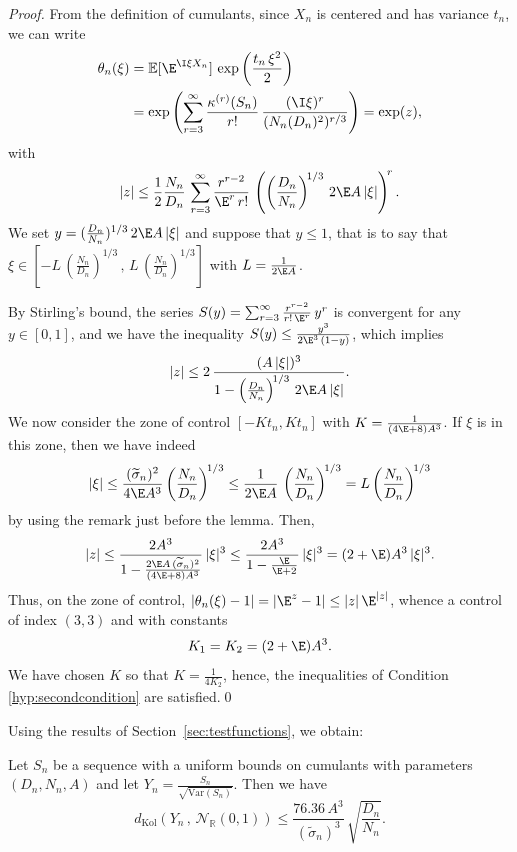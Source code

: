 \documentclass[envcountsame]{svmult}
\newcommand{\R}{\mathbb{R}}
\newcommand{\esper}{\mathbb{E}}
\newcommand{\dkol}{d_\mathrm{Kol}}
\newcommand{\var}{\mathrm{Var}}
\newcommand{\gauss}{\mathcal{N}_{\R}(0,1)}
\begin{document}
\begin{proof}
  From the definition of cumulants, since $X_n$ is centered and has variance $t_n$, we can write
\begin{align*}
 \theta_n(\xi)&=\esper[\E^{\I \xi X_n}] \,\exp\left(\frac{t_n\,\xi^2}{2}\right) \\
 &= \exp\left(\sum_{r= 3}^\infty \frac{\kappa^{(r)}(S_n)}{r!}\,\frac{(\I\xi)^r}{(N_n(D_n)^2)^{r/3}}\right) = \exp(z),
 \end{align*}
with
\[
|z| \leq \frac{1}{2} \frac{N_n}{D_n}\,\sum_{r=3}^\infty \frac{r^{r-2}}{\E^r\,r!} \,\left(\left(\frac{D_n}{N_n}\right)^{\!1/3}\,2\E A\, |\xi|\right)^{\!r}.
\]
We set $y=(\frac{D_n}{N_n})^{1/3}\,2\E A\, |\xi|$ and suppose that $y \leq 1$, that is to say that $\xi \in [-L\,(\frac{N_n}{D_n})^{1/3}\,,\,L\,(\frac{N_n}{D_n})^{1/3}]$ with $L=\frac{1}{2\E A}$. \medskip

By Stirling's bound, the series $S(y)=\sum_{r=3}^\infty \frac{r^{r-2}}{r!\,\E^r}\,y^r$ is convergent for any $y \in [0,1]$, and we have the inequality $S(y) \le \frac{y^3}{2\E^3\,(1-y)}$, which implies
\[
|z| \leq 2\,\frac{(A\,|\xi|)^3}{1-\left(\frac{D_n}{N_n}\right)^{\!1/3}\,2\E A\, |\xi|}.
\]
We now consider the zone of control $[-Kt_n,Kt_n]$ with $K = \frac{1}{(4\E+8) A^3}$. If $\xi$ is in this zone, then we have indeed
$$|\xi| \leq \frac{(\widetilde{\sigma}_n)^2}{4\E A^3} \left(\frac{N_n}{D_n}\right)^{\!1/3} \leq \frac{1}{2\E A}\,\left(\frac{N_n}{D_n}\right)^{\!1/3} = L\left(\frac{N_n}{D_n}\right)^{\!1/3}$$
by using the remark just before the lemma. Then, 
$$|z| \leq \frac{2A^3}{1-\frac{2\E A\,(\widetilde{\sigma}_n)^2}{(4\E+8)A^3}}\,|\xi|^3\leq \frac{2A^3}{1-\frac{\E}{\E+2}}\,|\xi|^3  =(2+\E)A^3\,|\xi|^3.$$
Thus, on the zone of control, $|\theta_n(\xi)-1| = |\E^{z}-1| \leq |z|\,\E^{|z|}$, whence a control of index $(3,3)$ and with constants
\begin{equation*}
K_1 = K_2 = (2+\E)A^3.
\end{equation*}
We have chosen $K$ so that $K=\frac{1}{4K_2}$, hence, the inequalities of Condition \ref{hyp:secondcondition} are satisfied.\qed
\end{proof}

Using the results of Section~\ref{sec:testfunctions}, we obtain:
\begin{corollary}
  \label{cor:Cumulants_Kol}
  Let $S_n$ be a sequence with a uniform bounds on cumulants with parameters $(D_n,N_n,A)$
  and let $Y_n=\tfrac{S_n}{\sqrt{\var(S_n)}}$. Then we have
	$$\dkol(Y_n\,,\,\gauss) \leq \frac{76.36\,A^3}{(\widetilde{\sigma}_n)^3}\,\sqrt{\frac{D_n}{N_n}}.$$
\end{corollary}
\end{document}
